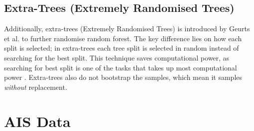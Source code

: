 \subsection{Extra-Trees (Extremely Randomised Trees)}\label{sec:et_theo}

Additionally, extra-trees (Extremely Randomised Trees) is introduced by Geurts et al. \citep{Geurts.2006} to further randomise random forest. The key difference lies on how each split is selected; in extra-trees each tree split is selected in random instead of searching for the best split. This technique saves computational power, as searching for best split is one of the tasks that takes up most computational power \citep{Geron.2019}. Extra-trees also do not bootstrap the samples, which mean it samples \emph{without} replacement.\\



\section{AIS Data}\label{sec:ais_theo}

